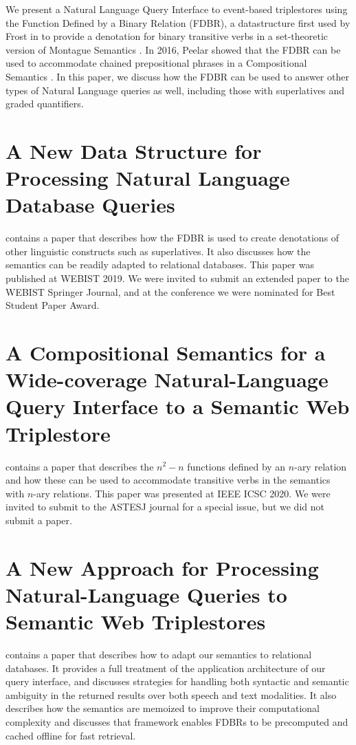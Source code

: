 \documentclass[../main.tex]{subfiles}
\begin{document}
\begin{refsection}
We present a Natural Language Query Interface to event-based triplestores using the Function Defined
by a Binary Relation (FDBR), a datastructure first used by Frost in \cite{frost1989constructing}
to provide a denotation for binary transitive verbs in a set-theoretic version of Montague Semantics \cite{Dowty:wall}.  In 2016, Peelar showed that the FDBR can be used to accommodate chained
prepositional phrases in a Compositional Semantics \cite{peelar2016accommodating}.  In this paper,
we discuss how the FDBR can be used to answer other types of Natural Language queries as well, including
those with superlatives and graded quantifiers.

\section{A New Data Structure for Processing Natural Language Database Queries}

\textbf{} contains a paper that describes how the FDBR is used
to create denotations of other linguistic constructs such as superlatives.  It also discusses
how the semantics can be readily adapted to relational databases.  This paper was published at WEBIST 2019.  We were invited to submit an extended paper to the WEBIST Springer Journal, and at the conference we were nominated for Best Student Paper Award.

\section{A Compositional Semantics for a Wide-coverage Natural-Language Query Interface to a Semantic Web Triplestore}

\textbf{} contains a paper that describes the $n^2 - n$ functions defined by an $n$-ary relation and how these can be used to accommodate transitive verbs in the semantics with $n$-ary relations.  This paper was presented at IEEE ICSC 2020.  We were invited to submit to the ASTESJ journal for a special issue, but we did not submit a paper.

\section{A New Approach for Processing Natural-Language Queries to Semantic Web Triplestores}

\textbf{} contains a paper that describes how to adapt our semantics
to relational databases.  It provides a full treatment of the application architecture of our query interface, and discusses strategies for handling both syntactic and semantic ambiguity in the returned results over both speech and text modalities.  It also describes how the semantics are memoized to improve their computational complexity and discusses that framework enables FDBRs to be precomputed and cached offline for fast retrieval.


\end{refsection}
\end{document}
